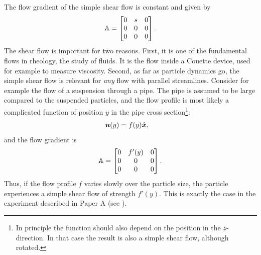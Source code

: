 \documentclass[thesis.tex]{subfiles}
\begin{document}
The flow gradient of the simple shear flow is constant and given by
\begin{align*}
	\mathbb{A} = \begin{bmatrix}
		0 & s & 0 \\
		0 & 0 & 0 \\
		0 & 0 & 0 
	\end{bmatrix}.
\end{align*}
The shear flow is important for two reasons. First, it is one of the fundamental flows in rheology, the study of fluids. It is the flow inside a Couette device, used for example to measure viscosity. Second, as far as particle dynamics go, the simple shear flow is relevant for \emph{any} flow with parallel streamlines. Consider for example the flow of a suspension through a pipe. The pipe is assumed to be large compared to the suspended particles, and the flow profile is most likely a complicated function of position $y$ in the pipe cross section\footnote{In principle the function should also depend on the position in the $z$-direction. In that case the result is also a simple shear flow, although rotated.}:
\begin{align*}
	\mbox{\boldmath$u$}(y) &= f(y)\hat{\mbox{\boldmath$x$}},
\end{align*}
 and the flow gradient is
\begin{align*}
	\mathbb{A} = \begin{bmatrix}
		0 & f'(y) & 0 \\
		0 & 0 & 0 \\
		0 & 0 & 0 
	\end{bmatrix}.
\end{align*}
Thus, if the flow profile $f$ varies slowly over the particle size, the particle experiences a simple shear flow of strength $f'(y)$. This is exactly the case in the experiment described in Paper A (see ).
\end{document}
